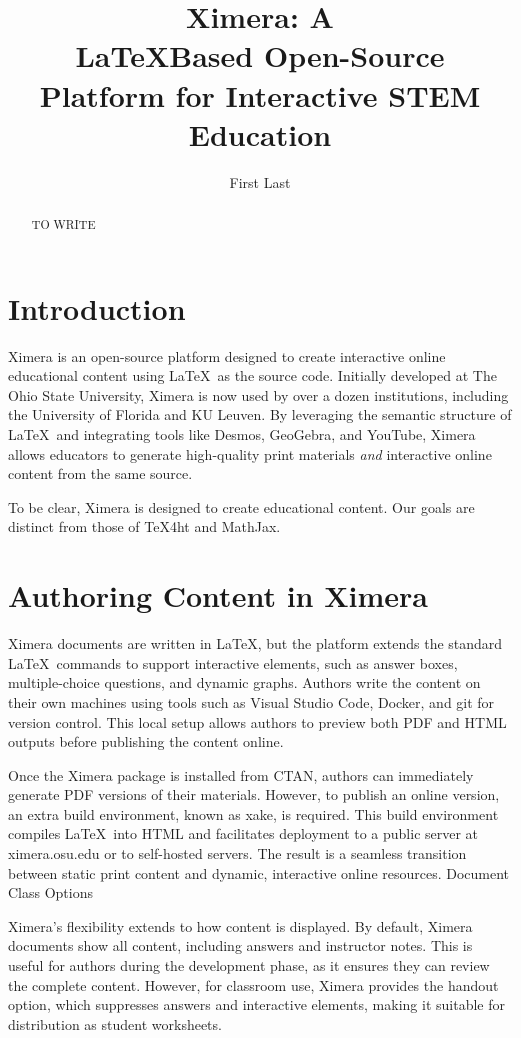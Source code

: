 \documentclass{ltugboat}
\title{Ximera: A \\LaTeX\-Based Open-Source Platform for Interactive STEM
    Education}
\author{First Last}
\begin{document}
\maketitle

\begin{abstract}
    TO WRITE
\end{abstract}

\section{Introduction}

Ximera is an open-source platform designed to create interactive online educational
content using \LaTeX\ as the source code. Initially developed at The Ohio State
University, Ximera is now used by over a dozen institutions, including
the University of Florida and KU Leuven. By leveraging the semantic structure
of \LaTeX\ and integrating tools like Desmos, GeoGebra, and YouTube, Ximera allows
educators to generate high-quality print materials \emph{and} interactive online
content from the same source.

To be clear, Ximera is designed to create educational content. Our goals are
distinct from those of TeX4ht and MathJax.

\section{Authoring Content in Ximera}


Ximera documents are written in \LaTeX, but the platform extends the standard
\LaTeX\ commands to support interactive elements, such as answer boxes,
multiple-choice questions, and dynamic graphs. Authors write the content on
their own machines using tools such as Visual Studio Code, Docker, and git for
version control. This local setup allows authors to preview both PDF and HTML
outputs before publishing the content online.

Once the Ximera package is installed from CTAN, authors can immediately
generate PDF versions of their materials. However, to publish an online
version, an extra build environment, known as xake, is required. This build
environment compiles \LaTeX\ into HTML and facilitates deployment to a public
server at ximera.osu.edu or to self-hosted servers. The result is a seamless
transition between static print content and dynamic, interactive online
resources.
Document Class Options

Ximera's flexibility extends to how content is displayed. By default, Ximera
documents show all content, including answers and instructor notes. This is
useful for authors during the development phase, as it ensures they can review
the complete content. However, for classroom use, Ximera provides the handout
option, which suppresses answers and interactive elements, making it suitable
for distribution as student worksheets.
\end{document}
